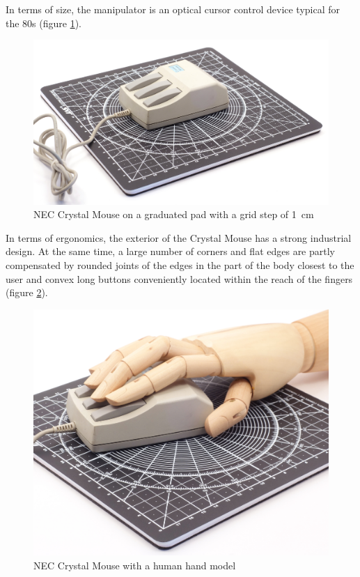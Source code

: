 \documentclass[11pt, a4paper]{article}
\begin{document}
In terms of size, the manipulator is an optical cursor control device typical for the 80s (figure \ref{fig:NecCrystalSize}).

\begin{figure}[h]
    \centering
    \includegraphics[scale=0.4]{1986_nec_crystal_mouse/NecKovrik_60.jpg}
    \caption{NEC Crystal Mouse on a graduated pad with a grid step of 1~cm}
    \label{fig:NecCrystalSize}
\end{figure}

In terms of ergonomics, the exterior of the Crystal Mouse has a strong industrial design. At the same time, a large number of corners and flat edges are partly compensated by rounded joints of the edges in the part of the body closest to the user and convex long buttons conveniently located within the reach of the fingers (figure \ref{fig:NecCrystalHand}).

\begin{figure}[h]
    \centering
    \includegraphics[scale=0.4]{1986_nec_crystal_mouse/NecRuka_30.jpg}
    \caption{NEC Crystal Mouse with a human hand model}
    \label{fig:NecCrystalHand}
\end{figure}
\end{document}

